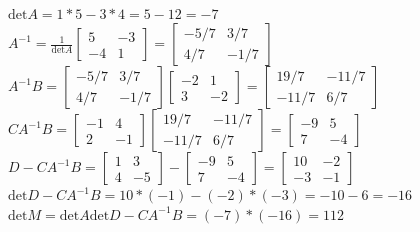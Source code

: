 \documentclass{article}
\begin{document}
{{\begin{enumerate}
\begin{enumerate}[a.]
\\$\textrm{det}A=1*5-3*4=5-12=-7$
\\$A^{-1}=\frac{1}{\textrm{det}A}\left[\begin{array}{cc}5 & -3\\-4 & 1\end{array}\right]=\left[\begin{array}{cc}-5/7 & 3/7\\4/7 & -1/7\end{array}\right]$
\\$A^{-1}B=\left[\begin{array}{cc}-5/7 & 3/7\\4/7 & -1/7\end{array}\right]\left[\begin{array}{cc}-2 & 1\\3 & -2\end{array}\right]=\left[\begin{array}{cc}19/7 & -11/7\\-11/7 & 6/7\end{array}\right]$
\\$CA^{-1}B=\left[\begin{array}{cc}-1 & 4\\2 & -1\end{array}\right]\left[\begin{array}{cc}19/7 & -11/7\\-11/7 & 6/7\end{array}\right]=\left[\begin{array}{cc}-9 & 5\\7 & -4\end{array}\right]$
\\$D-CA^{-1}B=\left[\begin{array}{cc}1 & 3\\4 & -5\end{array}\right]-\left[\begin{array}{cc}-9 & 5\\7 & -4\end{array}\right]=\left[\begin{array}{cc}10 & -2\\-3 & -1\end{array}\right]$
\\$\textrm{det}D-CA^{-1}B=10*(-1) - (-2)*(-3)=-10-6=-16$
\\$\textrm{det}M=\textrm{det}A\textrm{det}D-CA^{-1}B=(-7)*(-16)=112$

\end{enumerate}


\end{enumerate}}}
\end{document}
